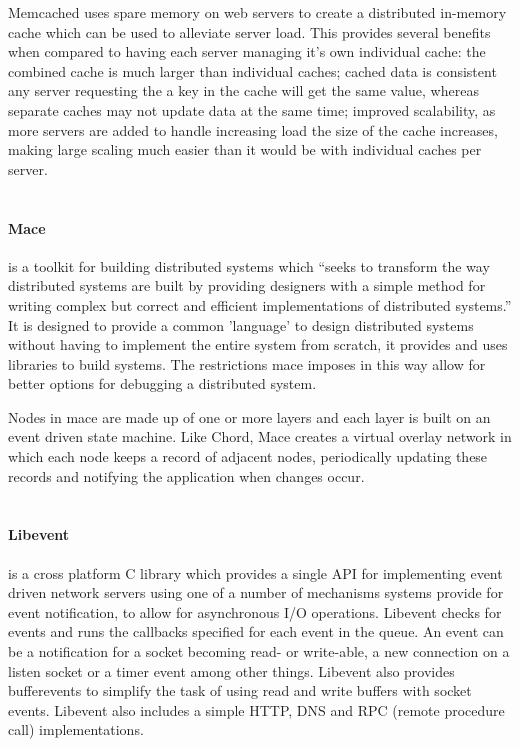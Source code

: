 \documentclass{article}
\begin{document}
Memcached uses spare memory on web servers to create a distributed in-memory cache which can be used to alleviate server load. This provides several benefits when compared to having each server managing it's own individual cache: the combined cache is much larger than individual caches; cached data is consistent any server requesting the a key in the cache will get the same value, whereas separate caches may not update data at the same time; improved scalability, as more servers are added to handle increasing load the size of the cache increases, making large scaling much easier than it would be with individual caches per server.
\\
\\
\paragraph{Mace} \cite{mace} is a toolkit for building distributed systems which “seeks to transform the way distributed systems are built by providing designers with a simple method for writing complex but correct and efficient implementations of distributed systems.” \cite{mace_quote} It is designed to provide a common 'language' to design distributed systems without having to implement the entire system from scratch, it provides and uses libraries to build systems. The restrictions mace imposes in this way allow for better options for debugging a distributed system.

Nodes in mace are made up of one or more layers and each layer is built on an event driven state machine. Like Chord, Mace creates a virtual overlay network in which each node keeps a record of adjacent nodes, periodically updating these records and notifying the application when changes occur.
\\
\\
\paragraph{Libevent} \cite{libevent} is a cross platform C library which provides a single API for implementing event driven network servers using one of a number of mechanisms systems provide for event notification, to allow for asynchronous I/O operations. Libevent checks for events and runs the callbacks specified for each event in the queue. An event can be a notification for a socket becoming read- or write-able, a new connection on a listen socket or a timer event among other things. Libevent also provides bufferevents to simplify the task of using read and write buffers with socket events. Libevent also includes a simple HTTP, DNS and RPC (remote procedure call) implementations.
\\
\\
\end{document}
